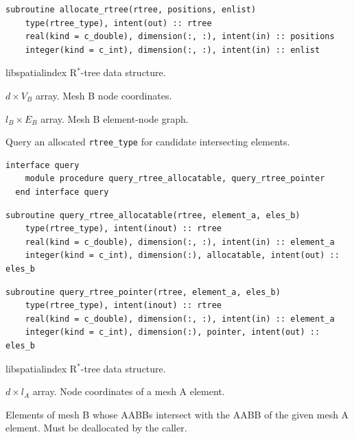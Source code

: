 \documentclass{article}
\begin{document}
\begin{lstlisting}[language=FORTRAN]  
  subroutine allocate_rtree(rtree, positions, enlist)
    type(rtree_type), intent(out) :: rtree
    real(kind = c_double), dimension(:, :), intent(in) :: positions
    integer(kind = c_int), dimension(:, :), intent(in) :: enlist
\end{lstlisting}

\begin{description}[font=\ttfamily\bfseries,leftmargin=2.2\parindent,labelindent=1.7\parindent,noitemsep]
  \item[rtree] libspatialindex R${}^*$-tree data structure.
  \item[positions] $d \times V_B$ array. Mesh B node coordinates.
  \item[enlist] $l_B \times E_B$ array. Mesh B element-node graph.
\end{description}

\noindent Query an allocated \verb+rtree_type+ for candidate intersecting
elements.
  
\begin{lstlisting}[language=FORTRAN]
  interface query
    module procedure query_rtree_allocatable, query_rtree_pointer
  end interface query
\end{lstlisting}
    
\begin{lstlisting}[language=FORTRAN]    
  subroutine query_rtree_allocatable(rtree, element_a, eles_b)
    type(rtree_type), intent(inout) :: rtree
    real(kind = c_double), dimension(:, :), intent(in) :: element_a
    integer(kind = c_int), dimension(:), allocatable, intent(out) :: eles_b
\end{lstlisting}
  
\begin{lstlisting}[language=FORTRAN]      
  subroutine query_rtree_pointer(rtree, element_a, eles_b)
    type(rtree_type), intent(inout) :: rtree
    real(kind = c_double), dimension(:, :), intent(in) :: element_a
    integer(kind = c_int), dimension(:), pointer, intent(out) :: eles_b
\end{lstlisting}

\begin{description}[font=\ttfamily\bfseries,leftmargin=2.2\parindent,labelindent=1.7\parindent,noitemsep]
  \item[rtree] libspatialindex R${}^*$-tree data structure.
  \item[element\_a] $d \times l_A$ array. Node coordinates of a mesh A element.
  \item[eles\_b] Elements of mesh B whose AABBs intersect with the AABB of the
    given mesh A element. Must be deallocated by the caller.
\end{description}
\end{document}
